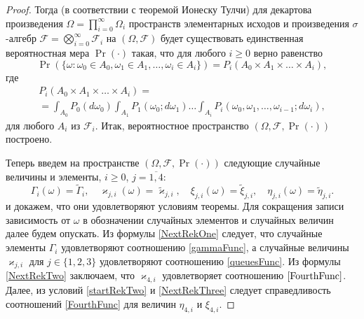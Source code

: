 \begin{proof}
Тогда (в соответствии с теоремой Ионеску Тулчи) для декартова произведения $\Omega=\prod\limits_{i=0}^{\infty}\Omega_i$ пространств элементарных исходов и произведения $\sigma$-алгебр ${\mathcal F}=\bigotimes\limits_{i=0}^{\infty} {\mathcal F}_i$ на $(\Omega,  {\mathcal F})$ будет существовать единственная вероятностная мера $\Pr(\cdot)$ такая,   что для любого $i \geqslant 0$ верно равенство
\begin{equation}
\Pr(\{\omega \colon \omega_0 \in A_0,   \omega_1 \in A_1,   \ldots,  \omega_i\in A_i\})= P_i(A_0 \times A_1 \times \ldots \times A_i), 
\label{ProbabilitiesGeneral}
\end{equation}
где 
\begin{multline}
 P_i(A_0 \times A_1 \times \ldots \times A_i) =\\ = \int_{A_0} P_0(d \omega_0) \int_{A_1} P_1(\omega_0;d \omega_1) \ldots \int_{A_i} P_i(\omega_0,  \omega_1,  \ldots,  \omega_{i-1}; d \omega_i), 
\label{ProbabilitiesGeneralOne}
\end{multline}
для любого $A_i$ из ${\mathcal F}_i$. Итак,  вероятностное пространство $(\Omega,  {\mathcal F},  \Pr(\cdot))$ построено. 

Теперь введем на пространстве $(\Omega,  {\mathcal F},  \Pr(\cdot))$ следующие случайные величины и элементы,   $i \geqslant 0$,   $j =\overline{1,  4}$:
\begin{equation*}
    \Gamma_i(\omega) = \tilde{\Gamma}_i,   \quad \varkappa_{j,  i}(\omega) = \tilde{\varkappa}_{j,  i},  \quad
    \xi_{j,  i}(\omega) = \tilde{\xi}_{j,  i},   \quad \eta_{j,  i}(\omega) = \tilde{\eta}_{j,  i}.
\end{equation*}
и докажем,   что они  удовлетворяют условиям теоремы. Для сокращения записи зависимость от $\omega$ в обозначении случайных элементов и случайных величин далее будем опускать. Из формулы \eqref{NextRekOne} следует,   что случайные элементы $\Gamma_i$ удовлетворяют соотношению \eqref{gammaFunc},  а случайные величины $\varkappa_{j,  i}$ для $j\in \{1,   2,   3\}$ удовлетворяют соотношению \eqref{queuesFunc}. Из формулы \eqref{NextRekTwo} заключаем,  что $\varkappa_{4,  i}$ удовлетворяет соотношению $\eqref{FourthFunc}$. Далее,  из условий \eqref{startRekTwo} и \eqref{NextRekThree} следует справедливость соотношений \eqref{FourthFunc} для величин $\eta_{4,  i}$ и $\xi_{4,  i}$. 


\end{proof}
